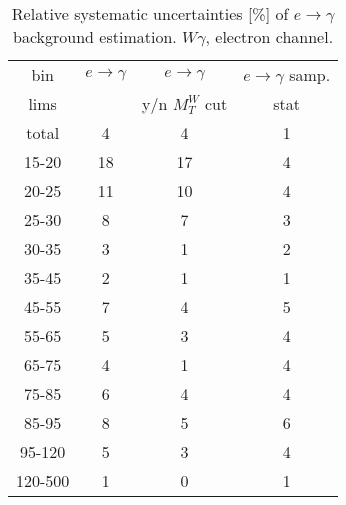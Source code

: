 \begin{table}[h]
  \scriptsize
  \begin{center}
  \caption{Relative systematic uncertainties [\%] of $e\rightarrow\gamma$ background estimation. $W\gamma$, electron channel.}
  \begin{tabular}{|c|c|c|c|}
    bin  & $e\rightarrow\gamma$ & $e\rightarrow\gamma$  & $e\rightarrow\gamma$ samp.\\
    lims  &  & y/n $M_T^W$ cut & stat\\ \hline
    total  & 4 & 4 & 1 \\ \hline
    15-20 & 18 & 17 & 4 \\ \hline
    20-25 & 11 & 10 & 4 \\ \hline
    25-30 & 8 & 7 & 3 \\ \hline
    30-35 & 3 & 1 & 2 \\ \hline
    35-45 & 2 & 1 & 1 \\ \hline
    45-55 & 7 & 4 & 5 \\ \hline
    55-65 & 5 & 3 & 4 \\ \hline
    65-75 & 4 & 1 & 4 \\ \hline
    75-85 & 6 & 4 & 4 \\ \hline
    85-95 & 8 & 5 & 6 \\ \hline
    95-120 & 5 & 3 & 4 \\ \hline
    120-500 & 1 & 0 & 1 \\ \hline
  \end{tabular}
  \label{tab:systInPercentEtogamma_ELECTRON_WGamma}
  \end{center}
\end{table}
